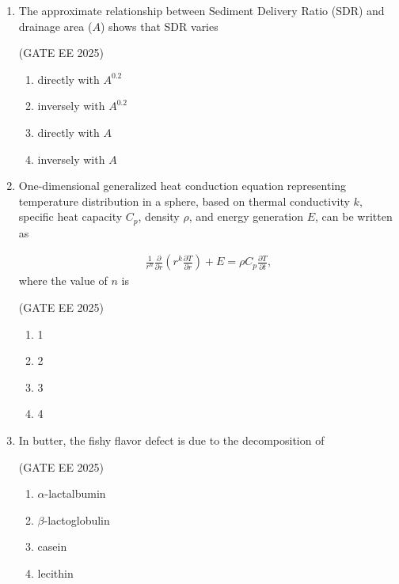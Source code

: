 \documentclass[journal,12pt,onecolumn]{IEEEtran}
\theoremstyle{remark}
\begin{document}
\begin{enumerate}
\item The approximate relationship between Sediment Delivery Ratio (SDR) and drainage area ($A$) shows that SDR varies

\hfill(GATE EE 2025)

\begin{multicols}{4}
\begin{enumerate}
\item directly with $A^{0.2}$
\item inversely with $A^{0.2}$
\item directly with $A$
\item inversely with $A$
\end{enumerate}
\end{multicols}

\item One-dimensional generalized heat conduction equation representing temperature distribution in a sphere, based on thermal conductivity $k$, specific heat capacity $C_p$, density $\rho$, and energy generation $E$, can be written as 

\begin{align*}
  \frac{1}{r^n}\frac{\partial}{\partial r}\left( r^k \frac{\partial T}{\partial r} \right) + E = \rho C_p \frac{\partial T}{\partial t},  
\end{align*}
where the value of $n$ is

\hfill(GATE EE 2025)

\begin{multicols}{4}
\begin{enumerate}
\item 1
\item 2
\item 3
\item 4
\end{enumerate}
\end{multicols}

\item In butter, the fishy flavor defect is due to the decomposition of

\hfill(GATE EE 2025)

\begin{multicols}{4}
\begin{enumerate}
\item $\alpha$-lactalbumin
\item $\beta$-lactoglobulin
\item casein
\item lecithin
\end{enumerate}
\end{multicols}


\end{enumerate}
\end{document}
